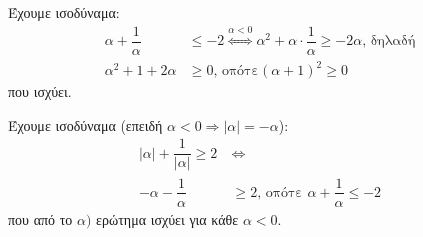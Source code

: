 
\begin{alist}
\item Έχουμε ισοδύναμα:
\begin{align*}
\alpha + \dfrac{1}{\alpha} &\le -2 \overset{\alpha < 0}{\Leftrightarrow}
\alpha^2 + \alpha \cdot \dfrac{1}{\alpha} \ge -2\alpha\text{, δηλαδή} \\
\alpha^2 + 1 + 2\alpha &\ge 0\text{, οπότε} (\alpha + 1)^2 \ge 0
\end{align*}
που ισχύει.

\item Έχουμε ισοδύναμα (επειδή $\alpha < 0 \Rightarrow |\alpha| = -\alpha$):
\begin{align*}
|\alpha| + \dfrac{1}{|\alpha|} \ge 2 \ &\Leftrightarrow \\
-\alpha - \dfrac{1}{\alpha} &\ge 2\text{, οπότε }\alpha + \dfrac{1}{\alpha} \le -2
\end{align*}
που από το $\alpha)$ ερώτημα ισχύει για κάθε $\alpha < 0$.
\end{alist}

